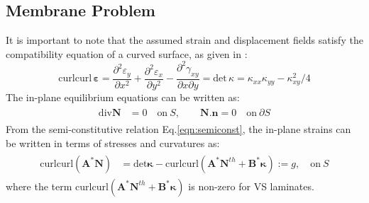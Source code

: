 \documentclass[journal]{new-aiaa}
\begin{document}
\subsection{Membrane Problem}
It is important to note that the assumed strain and displacement fields satisfy the compatibility equation of a curved surface, as given in \cite{Calladine83}:
\begin{equation}
\label{eqn:compat}
\text{curl}\text{curl}\,\boldsymbol\varepsilon= \frac{\partial^2 \varepsilon_y }{\partial x^2} + \frac{\partial^2 \varepsilon_x }{\partial y^2} -
\frac{\partial^2 \gamma_{xy} }{\partial x  \partial y}=\text{det}\,\kappa= \kappa_{xx}\kappa_{yy} - {\kappa_{xy}^2}/{4}
\end{equation}
The in-plane equilibrium equations can be written as:
\begin{eqnarray}
\label{eqn:eqm}
\begin{aligned}
\text{div} \boldsymbol{N} &= 0\quad \text{on} \: S, \qquad  \boldsymbol{N}. \boldsymbol{n} = 0 \quad \text{on} \: \partial S
\end{aligned}
\end{eqnarray}
From the semi-constitutive relation Eq.\ref{eqn:semiconst}, the in-plane strains can be written in terms of stresses and curvatures as:
%
\begin{eqnarray}
\label{eqn:compat2}
\begin{aligned}
\text{curl}\text{curl}(\boldsymbol{A}^\ast\boldsymbol{N}) &=\text{det}\boldsymbol\kappa - \text{curl}\text{curl}\left(\boldsymbol{A}^\ast\boldsymbol{N}^{th}+\boldsymbol{B}^\ast\boldsymbol\kappa\right):= g,  \quad  \text{on} \: S
\end{aligned}
\end{eqnarray}
where the term  $\text{curl}\text{curl}\left(\boldsymbol{A}^\ast\boldsymbol{N}^{th}+\boldsymbol{B}^\ast\boldsymbol\kappa\right)$ is non-zero for VS laminates.


\end{document}
